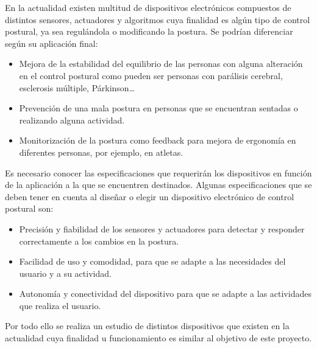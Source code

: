 En la actualidad existen multitud de dispositivos electrónicos \cite{dispositivos} compuestos de distintos sensores, actuadores y algoritmos cuya finalidad es algún tipo de control postural, ya sea regulándola o modificando la postura. Se podrían diferenciar según su aplicación final: 
\begin{itemize}
    \item Mejora de la estabilidad del equilibrio de las personas con alguna alteración en el control postural como pueden ser personas con parálisis cerebral, esclerosis múltiple, Párkinson… 

    \item Prevención de una mala postura en personas que se encuentran sentadas o realizando alguna actividad. 

    \item Monitorización de la postura como feedback para mejora de ergonomía en diferentes personas, por ejemplo, en atletas\cite{Deportistas_1,Deportistas_2}.
\end{itemize}

Es necesario conocer las especificaciones que requerirán los dispositivos en función de la aplicación a la que se encuentren destinados. Algunas especificaciones que se deben tener en cuenta al diseñar o elegir un dispositivo electrónico de control postural son: 
\begin{itemize}
    \item Precisión y fiabilidad de los sensores y actuadores para detectar y responder correctamente a los cambios en la postura. 

    \item Facilidad de uso y comodidad, para que se adapte a las necesidades del usuario y a su actividad. 

    \item Autonomía y conectividad del dispositivo para que se adapte a las actividades que realiza el usuario. 
\end{itemize}

Por todo ello se realiza un estudio de distintos dispositivos que existen en la actualidad cuya finalidad u funcionamiento es similar al objetivo de este proyecto. 


